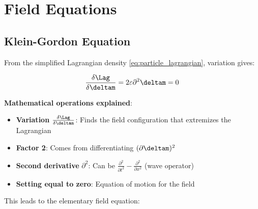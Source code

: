 	\begin{table}[htbp]
		\centering
		\caption{Unified description of the lepton family}
		\label{tab:lepton_parameters}
	\end{table}
	
	\section{Field Equations}
	
	\subsection{Klein-Gordon Equation}
	
	From the simplified Lagrangian density \eqref{eq:particle_lagrangian}, variation gives:
	
	\begin{equation}
		\frac{\delta \Lag}{\delta \deltam} = 2\varepsilon \partial^2 \deltam = 0
	\end{equation}
	
	\textbf{Mathematical operations explained}:
	\begin{itemize}
		\item \textbf{Variation} $\frac{\delta \Lag}{\delta \deltam}$: Finds the field configuration that extremizes the Lagrangian
		\item \textbf{Factor 2}: Comes from differentiating $(\partial \deltam)^2$
		\item \textbf{Second derivative} $\partial^2$: Can be $\frac{\partial^2}{\partial t^2} - \frac{\partial^2}{\partial x^2}$ (wave operator)
		\item \textbf{Setting equal to zero}: Equation of motion for the field
	\end{itemize}
	
	This leads to the elementary field equation:
	
